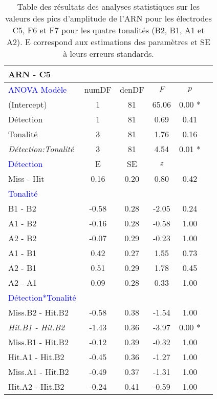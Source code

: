 \begin{landscape}
\begin{table}
\centering
\tiny
\caption[Table des résultats des analyses statistiques de l'ARN pour les électrodes C5, F6 et F7]{Table des résultats des analyses statistiques sur les valeurs des pics d'amplitude de l'ARN pour les électrodes C5, F6 et F7 pour les quatre tonalités (B2, B1, A1 et A2). E correspond aux estimations des paramètres et SE à leurs erreurs standards.}
\label{tab:table5statsARN}
\begin{multicols}{3}
\begin{tabular}{|l||*{5}{c|}}
\hline
\textbf{ARN - C5} & & & & \\
\hline
\textcolor{blue}{ANOVA Modèle} & numDF & denDF & $F$ & $p$ \\ 
\hline
(Intercept) & 1 & 81 & 65.06 & 0.00 * \\ 
Détection & 1 & 81 & 0.69 & 0.41 \\ 
Tonalité & 3 & 81 & 1.76 & 0.16 \\ 
\textit{Détection:Tonalité} & 3 & 81 & 4.54 & 0.01 *\\ 
\hline
\textcolor{blue}{Détection} & E & SE & $z$ & \\ 
\hline
Miss - Hit & 0.16 & 0.20 & 0.80 & 0.42 \\ 
\hline
\textcolor{blue}{Tonalité} & & & & \\ 
\hline
B1 - B2 & -0.58 & 0.28 & -2.05 & 0.24 \\ 
A1 - B2 & -0.16 & 0.28 & -0.58 & 1.00 \\ 
A2 - B2 & -0.07 & 0.29 & -0.23 & 1.00 \\ 
A1 - B1 & 0.42 & 0.27 & 1.55 & 0.73 \\ 
A2 - B1 & 0.51 & 0.29 & 1.78 & 0.45 \\ 
A2 - A1 & 0.09 & 0.28 & 0.33 & 1.00 \\ 
\hline
\textcolor{blue}{Détection*Tonalité} & & & & \\ 
\hline
Miss.B2 - Hit.B2 & -0.58 & 0.38 & -1.54 & 1.00 \\ 
\textit{Hit.B1 - Hit.B2} & -1.43 & 0.36 & -3.97 & 0.00 * \\ 
Miss.B1 - Hit.B2 & -0.12 & 0.39 & -0.32 & 1.00 \\ 
Hit.A1 - Hit.B2 & -0.45 & 0.36 & -1.27 & 1.00 \\ 
Miss.A1 - Hit.B2 & -0.49 & 0.37 & -1.31 & 1.00 \\ 
Hit.A2 - Hit.B2 & -0.24 & 0.41 & -0.59 & 1.00 \\ 

\end{tabular}
\end{multicols}
\end{table}
\end{landscape}
